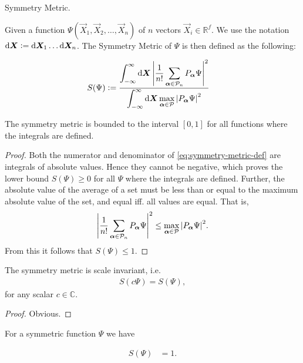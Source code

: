 \documentclass[Thesis.tex]{subfiles}
\begin{document}
\begin{definition}{Symmetry Metric.}

    Given a function $\Psi(\vec X_1, \vec X_2,\dots,\vec X_n)$ of $n$ vectors $\vec
    X_i\in \mathbb{R}^f$. We use the notation $\dd{\bm{X}}\vcentcolon= \dd{\bm{X}_1}\dots\dd{\bm{X}_n}$.
    The Symmetry Metric of $\Psi$ is then defined as the following:

    \begin{align}\label{eq:symmetry-metric-def}
        S(\Psi) &\vcentcolon=  \frac{\displaystyle \int_{-\infty}^{\infty} \dd{\bm{X}}\abs{\frac{1}{n!}
        \sum_{\bm{\alpha}\in \mathcal{P}_n} P_{\bm{\alpha}}\Psi}^2}{\displaystyle \int_{-\infty}^{\infty}\dd{\bm{X}}
        \max_{\bm{\alpha}\in \mathcal{P}} \abs{P_{\bm{\alpha}}\Psi}^2}
    \end{align}
\end{definition}
\begin{corollary}
    The symmetry metric is bounded to the interval $[0, 1]$ for all functions where the integrals are defined.
\end{corollary}
\begin{proof}
    Both the numerator and denominator of \autoref{eq:symmetry-metric-def} are
    integrals of absolute values. Hence they cannot be negative, which proves
    the lower bound $S(\Psi) \geq 0$ for all $\Psi$ where the integrals are defined. Further, the
    absolute value of the average of a set must be less than or equal to the maximum
    absolute value of the set, and equal iff. all values are equal. That is,
    \begin{align}
        \abs{\frac{1}{n!} \sum_{\bm{\alpha}\in \mathcal{P}_n} P_{\bm{\alpha}}\Psi}^2
        \leq \max_{\bm{\alpha}\in \mathcal{P}} \abs{P_{\bm{\alpha}}\Psi}^2.
    \end{align}
    From this it follows that $S(\Psi) \leq 1$.
\end{proof}
\begin{corollary}
   The symmetry metric is scale invariant, i.e.
    \begin{align}
        S(c\Psi) = S(\Psi),
    \end{align}
    for any scalar $c\in \mathbb{C}$.
\end{corollary}
\begin{proof}
   Obvious.
\end{proof}
\begin{corollary}
    For a symmetric function $\Psi$ we have

    \begin{align}
        S(\Psi) &= 1.
    \end{align}
\end{corollary}
\end{document}
